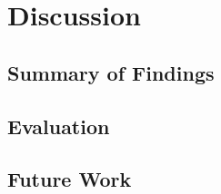 \chapter{Discussion}
\label{chapterlabel5}
\section{Summary of Findings}
\section{Evaluation}
\section{Future Work}